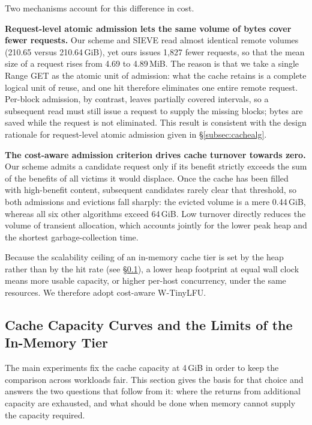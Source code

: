 Two mechanisms account for this difference in cost.

\textbf{Request-level atomic admission lets the same volume of bytes cover fewer
requests.}
Our scheme and SIEVE read almost identical remote volumes (210.65 versus
210.64\,GiB), yet ours issues 1{,}827 fewer requests, so that the mean size of a
request rises from 4.69 to 4.89\,MiB. The reason is that we take a single Range
GET as the atomic unit of admission: what the cache retains is a complete
logical unit of reuse, and one hit therefore eliminates one entire remote
request. Per-block admission, by contrast, leaves partially covered intervals,
so a subsequent read must still issue a request to supply the missing blocks;
bytes are saved while the request is not eliminated. This result is consistent
with the design rationale for request-level atomic admission given in
\S\ref{subsec:cachealg}.

\textbf{The cost-aware admission criterion drives cache turnover towards zero.}
Our scheme admits a candidate request only if its benefit strictly exceeds the
sum of the benefits of all victims it would displace. Once the cache has been
filled with high-benefit content, subsequent candidates rarely clear that
threshold, so both admissions and evictions fall sharply: the evicted volume is
a mere 0.44\,GiB, whereas all six other algorithms exceed 64\,GiB. Low turnover
directly reduces the volume of transient allocation, which accounts jointly for
the lower peak heap and the shortest garbage-collection time.

Because the scalability ceiling of an in-memory cache tier is set by the heap
rather than by the hit rate (see \S\ref{subsec:capacity}), a lower heap
footprint at equal wall clock means more usable capacity, or higher
per-host concurrency, under the same resources. We therefore adopt cost-aware
W-TinyLFU.

\subsection{Cache Capacity Curves and the Limits of the In-Memory Tier}
\label{subsec:capacity}

The main experiments fix the cache capacity at 4\,GiB in order to keep the
comparison across workloads fair. This section gives the basis for that choice
and answers the two questions that follow from it: where the returns from
additional capacity are exhausted, and what should be done when memory cannot
supply the capacity required.

